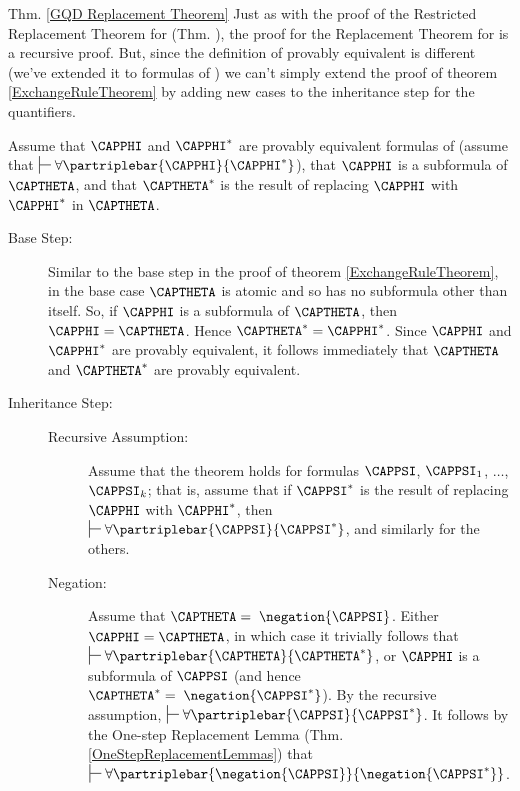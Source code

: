\begin{PROOFOF}{Thm. \ref{GQD Replacement Theorem}}
Just as with the proof of the Restricted Replacement Theorem for \GSD{} (Thm. ), the proof for the Replacement Theorem for \GQD{} is a recursive proof. But, since the definition of provably equivalent is different (we've extended it to formulas of \GQL{}) we can't simply extend the proof of theorem \ref{ExchangeRuleTheorem} by adding new cases to the inheritance step for the quantifiers. 

Assume that $\CAPPHI$ and $\CAPPHI^*$ are provably equivalent formulas of \GQL{} (assume that $\sststile{}{}\forall\partriplebar{\CAPPHI}{\CAPPHI^*}$), that $\CAPPHI$ is a subformula of $\CAPTHETA$, and that $\CAPTHETA^*$ is the result of replacing $\CAPPHI$ with $\CAPPHI^*$ in $\CAPTHETA$.
\begin{description}
\item[Base Step:]
Similar to the base step in the proof of theorem \ref{ExchangeRuleTheorem}, in the base case $\CAPTHETA$ is atomic and so has no subformula other than itself.
So, if $\CAPPHI$ is a subformula of $\CAPTHETA$, then $\CAPPHI=\CAPTHETA$. Hence $\CAPTHETA^*=\CAPPHI^*$. Since $\CAPPHI$ and $\CAPPHI^*$ are provably equivalent, it follows immediately that $\CAPTHETA$ and $\CAPTHETA^*$ are provably equivalent. 

\item[Inheritance Step:] \hfill 

\begin{description}
\item[Recursive Assumption:] 
Assume that the theorem holds for formulas $\CAPPSI$, $\CAPPSI_1$, $\ldots$, $\CAPPSI_{\integer{k}}$; that is, assume that if $\CAPPSI^*$ is the result of replacing $\CAPPHI$ with $\CAPPHI^*$, then $\sststile{}{}\forall\partriplebar{\CAPPSI}{\CAPPSI^*}$, and similarly for the others.

\item[Negation:]
Assume that $\CAPTHETA=\;\negation{\CAPPSI}$.
Either $\CAPPHI=\CAPTHETA$, in which case it trivially follows that $\sststile{}{}\forall\partriplebar{\CAPTHETA}{\CAPTHETA^*}$, or $\CAPPHI$ is a subformula of $\CAPPSI$ (and hence $\CAPTHETA^*=\;\negation{\CAPPSI^*}$).
By the recursive assumption, $\sststile{}{}\forall\partriplebar{\CAPPSI}{\CAPPSI^*}$.
It follows by the One-step Replacement Lemma (Thm. \ref{OneStepReplacementLemmas}) that $\sststile{}{}\forall\partriplebar{\negation{\CAPPSI}}{\negation{\CAPPSI^*}}$. 


\end{description}
\end{description}
\end{PROOFOF}

